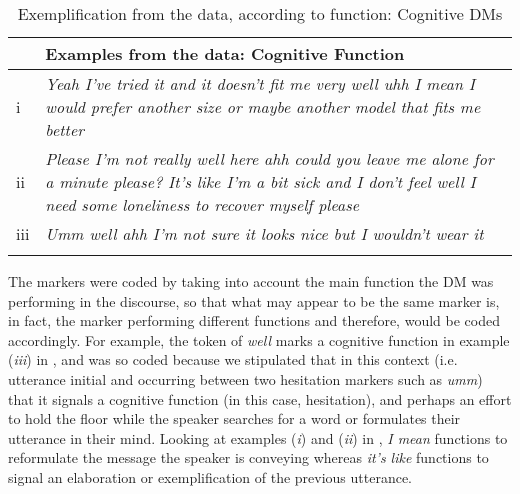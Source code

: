 \documentclass[output=paper]{langsci/langscibook}
\begin{document}
\begin{table}
\caption{\label{tab:ament:2} Exemplification from the data, according to function: Cognitive DMs}

\begin{tabularx}{\textwidth}{lQ}
\lsptoprule
&\bfseries Examples from the data: Cognitive Function\\
\midrule

i &  \textit{Yeah I’ve tried it and it doesn’t fit me very well uhh I mean I would prefer another size or maybe another model that fits me better}\\

ii &  \textit{Please I’m not really well here ahh could you leave me alone for a minute please? It’s like I’m a bit sick and I don’t feel well I need some loneliness to recover myself please}\\

iii &  \textit{Umm well ahh I’m not sure it looks nice but I wouldn’t wear it}\\
\lspbottomrule
\end{tabularx}
\end{table}


The markers were coded by taking into account the main function the DM was performing in the discourse, so that what may appear to be the same marker is, in fact, the marker performing different functions and therefore, would be coded accordingly. For example, the token of \textit{well} marks a cognitive function in example (\textit{iii}) in , and was so coded because we stipulated that in this context (i.e. utterance initial and occurring between two hesitation markers such as \textit{umm}) that it signals a cognitive function (in this case, hesitation), and perhaps an effort to hold the floor while the speaker searches for a word or formulates their utterance in their mind. Looking at examples (\textit{i}) and (\textit{ii}) in , \textit{I mean} functions to reformulate the message the speaker is conveying whereas \textit{it’s like} functions to signal an elaboration or exemplification of the previous utterance. 
\end{document}
